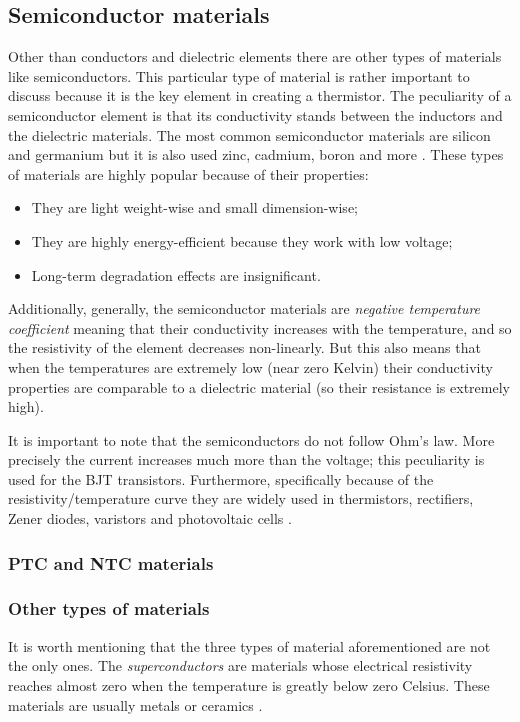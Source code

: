 \subsection{Semiconductor materials}
Other than conductors and dielectric elements there are other types of materials like semiconductors. This particular type of material is rather important to discuss because it is the key element in creating a thermistor. The peculiarity of a semiconductor element is that its conductivity stands between the inductors and the dielectric materials. The most common semiconductor materials are silicon and germanium but it is also used zinc, cadmium, boron and more \cite{Gupta20163}. These types of materials are highly popular because of their properties:
\vspace{-3px}\begin{itemize}
\renewcommand*{\labelitemi}{$\circ$}
\setlength{\itemsep}{-2px}
    \item They are light weight-wise and small dimension-wise;
    \item They are highly energy-efficient because they work with low voltage;
    \item Long-term degradation effects are insignificant.
\end{itemize}

\noindent Additionally, generally, the semiconductor materials are \textsl{negative temperature coefficient} meaning that their conductivity increases with the temperature, and so the resistivity of the element decreases non-linearly. But this also means that when the temperatures are extremely low (near zero Kelvin) their conductivity properties are comparable to a dielectric material (so their resistance is extremely high).

It is important to note that the semiconductors do not follow Ohm's law. More precisely the current increases much more than the voltage; this peculiarity is used for the BJT transistors. Furthermore, specifically because of the resistivity/temperature curve they are widely used in thermistors, rectifiers, Zener diodes, varistors and photovoltaic cells \cite{Gupta20163}.

\subsubsection{PTC and NTC materials}

\subsubsection*{Other types of materials}
It is worth mentioning that the three types of material aforementioned are not the only ones. The \textsl{superconductors} are materials whose electrical resistivity reaches almost zero when the temperature is greatly below zero Celsius. These materials are usually metals or ceramics \cite{Gupta20163}.


